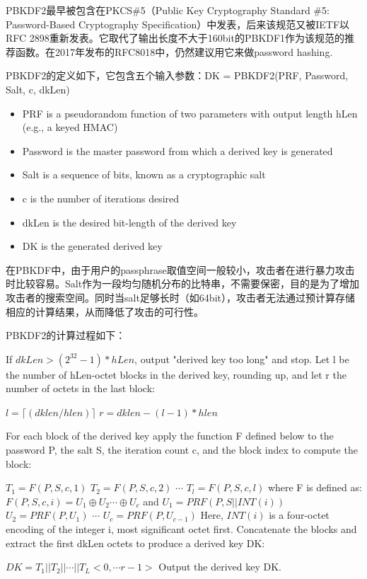 \documentclass{article}
\begin{document}
PBKDF2最早被包含在PKCS\#5（Public Key Cryptography Standard \#5: Password-Based Cryptography Specification）中发表，后来该规范又被IETF以RFC 2898重新发表。它取代了输出长度不大于160bit的PBKDF1作为该规范的推荐函数。在2017年发布的RFC8018中，仍然建议用它来做password hashing.

PBKDF2的定义如下，它包含五个输入参数：\textsf{DK = PBKDF2(PRF, Password, Salt, c, dkLen)}
\begin{itemize}
\item PRF is a pseudorandom function of two parameters with output length hLen (e.g., a keyed HMAC)
\item Password is the master password from which a derived key is generated
\item Salt is a sequence of bits, known as a cryptographic salt
\item c is the number of iterations desired
\item dkLen is the desired bit-length of the derived key
\item DK is the generated derived key
\end{itemize}


在PBKDF中，由于用户的passphrase取值空间一般较小，攻击者在进行暴力攻击时比较容易。Salt作为一段均匀随机分布的比特串，不需要保密，目的是为了增加攻击者的搜索空间。同时当salt足够长时（如64bit），攻击者无法通过预计算存储相应的计算结果，从而降低了攻击的可行性。

PBKDF2的计算过程如下：

If $dkLen > (2^{32} - 1) * hLen$, output "derived key too long" and stop.
Let l be the number of hLen-octet blocks in the derived key, rounding up, and let r the number of octets in the last block:

$ l=\lceil (dklen/hlen) \rceil $  
$r=dklen -(l-1)*hlen$

For each block of the derived key apply the function F defined below to the password P, the salt S, the iteration count c, and the block index to compute the block:

$T_1=F(P,S,c,1)$
$T_2=F(P,S,c,2)$
$\cdots$
$T_l=F(P,S,c,l)$  
where F is defined as:
$F(P,S,c,i)=U_1 \oplus U_2  \cdots \oplus U_c$  
and   
$U_1=PRF(P,S||INT(i))$  
$U_2=PRF(P,U_1)$  
$\cdots$  
$U_c=PRF(P,U_{c-1})$  
Here, $INT (i)$ is a four-octet encoding of the integer i, most significant octet first.  
Concatenate the blocks and extract the first dkLen octets to produce a derived key DK:   
 
$DK=T_1||T_2||\cdots|| T_L<0,\cdots r-1>$
Output the derived key DK.
\end{document}
